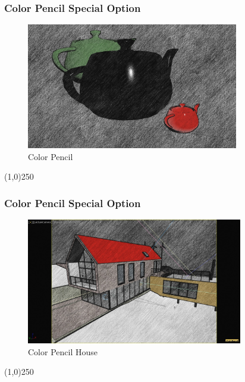 \begin{frame}
\frametitle{Color Pencil Special Option}
\begin{figure}
	\centering
	\includegraphics[height=5.5cm]{img/ViewportOptions/ColorPencil.jpg}
	\caption{Color Pencil}
	\label{fig:ColorPencil}
\end{figure}
\end{frame}
\begin{center}\line(1,0){250}\end{center}



\begin{frame}
\frametitle{Color Pencil Special Option}
\begin{figure}
	\centering
	\includegraphics[height=5.5cm]{img/ViewportOptions/ColorPencilHouse.jpg}
	\caption{Color Pencil House}
	\label{fig:ColorPencilHouse}
\end{figure}
\end{frame}
\begin{center}\line(1,0){250}\end{center}






